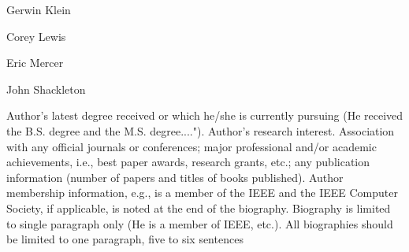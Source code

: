 \begin{IEEEbiography}{Gerwin Klein}{\,}
\end{IEEEbiography}

\begin{IEEEbiography}{Corey Lewis}{\,}
\end{IEEEbiography}

\begin{IEEEbiography}{Eric Mercer}{\,}
\end{IEEEbiography}

\begin{IEEEbiography}{John Shackleton}{\,}
\end{IEEEbiography}

Author's latest degree received or which he/she is currently pursuing
(He received the B.S. degree and the M.S. degree...."). Author's
research interest. Association with any official journals or
conferences; major professional and/or academic achievements, i.e.,
best paper awards, research grants, etc.; any publication information
(number of papers and titles of books published). Author membership
information, e.g., is a member of the IEEE and the IEEE Computer
Society, if applicable, is noted at the end of the
biography. Biography is limited to single paragraph only (He is a
member of IEEE, etc.). All biographies should be limited to one
paragraph, five to six sentences

